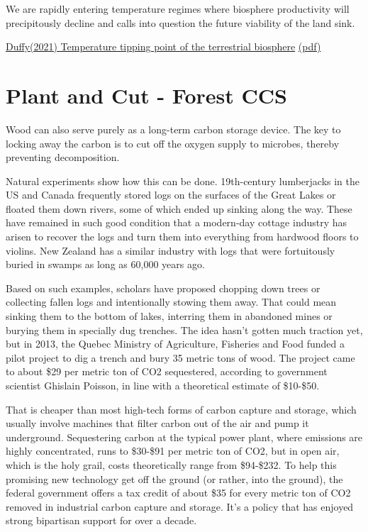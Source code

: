 \documentclass[
]{book}
\begin{document}
We are rapidly entering temperature regimes where biosphere productivity
will precipitously decline and
calls into question the future viability of the land sink.

\href{https://advances.sciencemag.org/content/7/3/eaay1052}{Duffy(2021) Temperature tipping point of the terrestrial biosphere}
\href{pdf/Duffy_2020_Temperature_Tipping_Point.pdf}{(pdf)}

\hypertarget{plant-and-cut---forest-ccs}{%
\section{Plant and Cut - Forest CCS}\label{plant-and-cut---forest-ccs}}

Wood can also serve purely as a long-term carbon storage device. The key to locking away the carbon is to cut off the oxygen supply to microbes, thereby preventing decomposition.

Natural experiments show how this can be done. 19th-century lumberjacks in the US and Canada frequently stored logs on the surfaces of the Great Lakes or floated them down rivers, some of which ended up sinking along the way. These have remained in such good condition that a modern-day cottage industry has arisen to recover the logs and turn them into everything from hardwood floors to violins. New Zealand has a similar industry with logs that were fortuitously buried in swamps as long as 60,000 years ago.

Based on such examples, scholars have proposed chopping down trees or collecting fallen logs and intentionally stowing them away. That could mean sinking them to the bottom of lakes, interring them in abandoned mines or burying them in specially dug trenches.
The idea hasn't gotten much traction yet, but in 2013, the Quebec Ministry of Agriculture, Fisheries and Food funded a pilot project to dig a trench and bury 35 metric tons of wood. The project came to about \$29 per metric ton of CO2 sequestered, according to government scientist Ghislain Poisson, in line with a theoretical estimate of \$10-\$50.

That is cheaper than most high-tech forms of carbon capture and storage, which usually involve machines that filter carbon out of the air and pump it underground. Sequestering carbon at the typical power plant, where emissions are highly concentrated, runs to \$30-\$91 per metric ton of CO2, but in open air, which is the holy grail, costs theoretically range from \$94-\$232. To help this promising new technology get off the ground (or rather, into the ground), the federal government offers a tax credit of about \$35 for every metric ton of CO2 removed in industrial carbon capture and storage. It's a policy that has enjoyed strong bipartisan support for over a decade.
\end{document}

